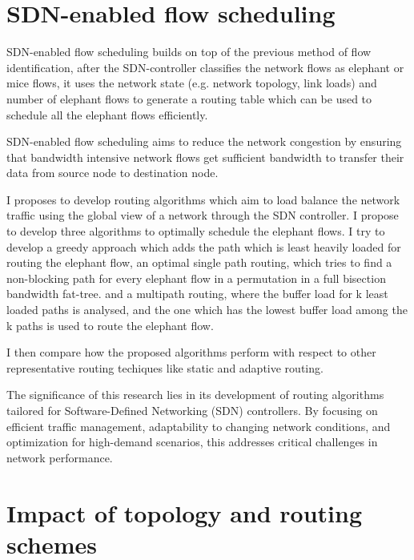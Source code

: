 \section{SDN-enabled flow scheduling}

SDN-enabled flow scheduling builds on top of the previous method 
of flow identification, after the SDN-controller classifies the
network flows as elephant or mice flows, it uses the network state (e.g. network
topology, link loads) and number of elephant flows to generate a routing table 
which can be used to schedule all the elephant flows efficiently. 

SDN-enabled flow scheduling aims to reduce the network congestion by ensuring that bandwidth
intensive network flows get sufficient bandwidth to transfer their data from source node to 
destination node.

I proposes to develop routing algorithms which aim to load balance the network traffic using the 
global view of a network through the SDN controller.
I propose to develop three algorithms to optimally schedule the elephant flows. I 
try to develop a greedy approach which 
adds the path which is least heavily loaded for routing the elephant flow, an optimal single path routing, which tries to find a non-blocking path for 
every elephant flow in a permutation in a full bisection bandwidth fat-tree. 
and a multipath routing, where the buffer load for k least loaded
paths is analysed, and the one which has the lowest buffer load among the k paths is used to route the elephant flow. 

I then compare how the proposed algorithms perform with respect to other representative routing techiques like static and adaptive routing.

The significance of this research lies in its development of routing algorithms tailored for Software-Defined Networking (SDN) controllers. By focusing on efficient traffic management, adaptability to changing network conditions, and optimization for high-demand scenarios, this addresses critical challenges in network performance.


\section{Impact of topology and routing schemes}


